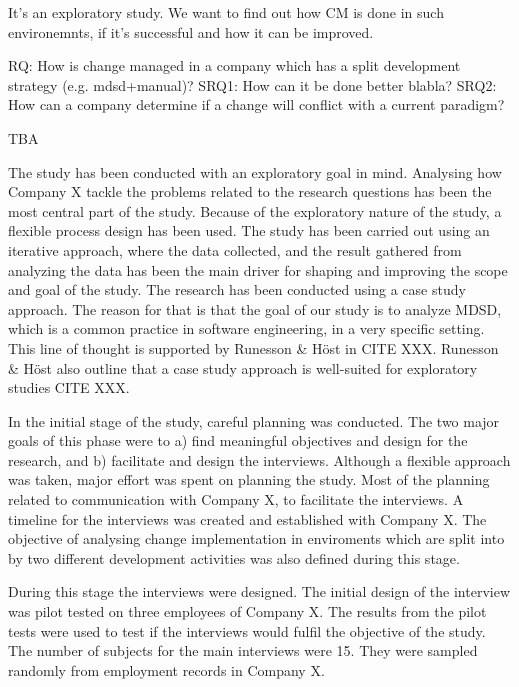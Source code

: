 \documentclass[times, 10pt,twocolumn]{IEEEtran}
\begin{document}
It's an exploratory study. We want to find out how CM is done in such environemnts, if it's successful and how it can be improved. 

RQ: How is change managed in a company which has a split development strategy (e.g. mdsd+manual)?
SRQ1: How can it be done better blabla?
SRQ2: How can a company determine if a change will conflict with a current paradigm?

TBA
\newpage



The study has been conducted with an exploratory goal in mind. Analysing how Company X tackle the problems related to the research questions has been the most central part of the study. Because of the exploratory nature of the study, a flexible process design has been used. The study has been carried out using an iterative approach, where the data collected, and the result gathered from analyzing the data has been the main driver for shaping and improving the scope and goal of the study. The research has been conducted using a case study approach. The reason for that is that the goal of our study is to analyze MDSD, which is a common practice in software engineering, in a very specific setting. This line of thought is supported by Runesson \& Höst in CITE XXX. Runesson \& Höst also outline that a case study approach is well-suited for exploratory studies CITE XXX. 

In the initial stage of the study, careful planning was conducted. The two major goals of this phase were to a) find meaningful objectives and design for the research, and b) facilitate and design the interviews. Although a flexible approach was taken, major effort was spent on planning the study. Most of the planning related to communication with Company X, to facilitate the interviews. A timeline for the interviews was created and established with Company X. The objective of analysing change implementation in enviroments which are split into by two different development activities was also defined during this stage. 


During this stage the interviews were designed. The initial design of the interview was pilot tested on three employees of Company X. The results from the pilot tests were used to test if the interviews would fulfil the objective of the study. The number of subjects for the main interviews were 15. They were sampled randomly from employment records in Company X. 
\end{document}
